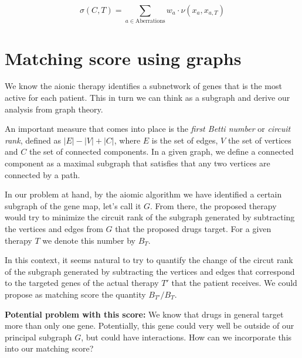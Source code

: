 \documentclass[titlepage, hidelinks, 12pt]{article}
\theoremstyle{plain}
\theoremstyle{remark}
\theoremstyle{definition}
\begin{document}
\begin{equation}
    \sigma(C, T) = \sum\limits_{a\in\text{Aberrations}} w_a\cdot \nu(x_a, x_{a,T})
    \label{eqn:ourMatchingScore}
\end{equation}

\newpage
\section{Matching score using graphs}
We know the aionic therapy identifies a subnetwork of genes that is the most active for each patient. This in turn we can think as a subgraph and derive our analysis from graph theory. 

An important measure that comes into place is the \textit{first Betti number} or \textit{circuit rank}, defined as $|E|-|V|+|C|$, where $E$ is the set of edges, $V$ the set of vertices and $C$ the set of connected components. In a given graph, we define a connected component as a maximal subgraph that satisfies that any two vertices are connected by a path. 

In our problem at hand, by the aiomic algorithm we have identified a certain subgraph of the gene map, let's call it $G$. From there, the proposed therapy would try to minimize the circuit rank of the subgraph generated by subtracting the vertices and edges from $G$ that the proposed drugs target. For a given therapy $T$ we denote this number by $B_T$.

In this context, it seems natural to try to quantify the change of the circut rank of the subgraph generated by subtracting the vertices and edges that correspond to the targeted genes of the actual therapy $T'$ that the patient receives. We could propose as matching score the quantity $B_{T'}/B_T$. 

\textbf{Potential problem with this score:} We know that drugs in general target more than only one gene. Potentially, this gene could very well be outside of our principal subgraph $G$, but could have interactions. How can we incorporate this into our matching score? 
\end{document}
